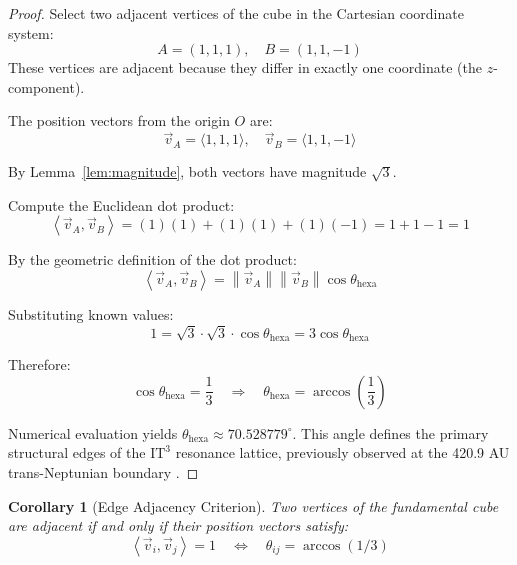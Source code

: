 \documentclass[12pt,a4paper,oneside]{article}
\newtheorem{corollary}[theorem]{Corollary}
\newcommand{\vecnorm}[1]{\left\|#1\right\|}
\newcommand{\inner}[2]{\left\langle #1, #2 \right\rangle}
\newcommand{\ITthree}{\text{IT}^3}
\begin{document}
\begin{proof}
Select two adjacent vertices of the cube in the Cartesian coordinate system:
\begin{equation}
    A = (1, 1, 1), \quad B = (1, 1, -1)
\end{equation}
These vertices are adjacent because they differ in exactly one coordinate (the $z$-component).

The position vectors from the origin $O$ are:
\begin{equation}
    \vec{v}_A = \langle 1, 1, 1 \rangle, \quad \vec{v}_B = \langle 1, 1, -1 \rangle
\end{equation}

By Lemma~\ref{lem:magnitude}, both vectors have magnitude $\sqrt{3}$.

Compute the Euclidean dot product:
\begin{equation}
    \inner{\vec{v}_A}{\vec{v}_B} = (1)(1) + (1)(1) + (1)(-1) = 1 + 1 - 1 = 1
\end{equation}

By the geometric definition of the dot product:
\begin{equation}
    \inner{\vec{v}_A}{\vec{v}_B} = \vecnorm{\vec{v}_A} \vecnorm{\vec{v}_B} \cos \theta_{\text{hexa}}
\end{equation}

Substituting known values:
\begin{equation}
    1 = \sqrt{3} \cdot \sqrt{3} \cdot \cos \theta_{\text{hexa}} = 3 \cos \theta_{\text{hexa}}
\end{equation}

Therefore:
\begin{equation}
    \cos \theta_{\text{hexa}} = \frac{1}{3} \quad \Longrightarrow \quad \theta_{\text{hexa}} = \arccos\left(\frac{1}{3}\right)
\end{equation}

Numerical evaluation yields $\theta_{\text{hexa}} \approx 70.528779^\circ$. This angle defines the primary structural edges of the $\ITthree$ resonance lattice, previously observed at the 420.9 AU trans-Neptunian boundary \cite{Logvinovich2025}.
\end{proof}

\begin{corollary}[Edge Adjacency Criterion]
Two vertices of the fundamental cube are adjacent if and only if their position vectors satisfy:
\begin{equation}
    \inner{\vec{v}_i}{\vec{v}_j} = 1 \quad \Longleftrightarrow \quad \theta_{ij} = \arccos(1/3)
\end{equation}
\end{corollary}
\end{document}
